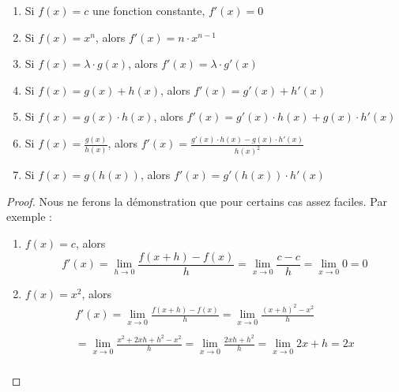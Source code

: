 \begin{proposition}
\begin{enumerate}
\item Si $f(x) = c$ une fonction constante, $f'(x) = 0$
\item Si $f(x) = x^n$, alors $f'(x) = n\cdot x^{n-1}$
\item Si $f(x) = \lambda \cdot g(x)$, alors $f'(x) = \lambda \cdot g'(x)$
\item Si $f(x) = g(x) + h(x)$, alors $f'(x) = g'(x) + h'(x)$
\item Si $f(x) = g(x) \cdot h(x)$, alors $f'(x) = g'(x) \cdot h(x) + g(x) \cdot h'(x)$
\item Si $f(x) = \frac{g(x)}{h(x)}$, alors $f'(x) = \frac{g'(x) \cdot h(x)- g(x) \cdot h'(x)}{h(x)^2}$
\item Si $f(x) = g\left(h(x)\right)$, alors $f'(x) = g'(h(x)) \cdot h'(x)$
\end{enumerate}
\end{proposition}

\begin{proof}
Nous ne ferons la démonstration que pour certains cas assez faciles. Par exemple :
\begin{enumerate}
\item $f(x) = c$, alors 
$$
f'(x) = \lim_{h\rightarrow 0} \frac{f(x+h) - f(x)}{h} = \lim_{x\rightarrow 0} \frac{c-c}{h} = \lim_{x\rightarrow 0} 0 = 0 
$$
\item $f(x) = x^2$, alors
$$
\begin{array}{l}
f'(x) = \lim_{x\rightarrow 0} \frac{f(x+h)-f(x)}{h} = \lim_{x\rightarrow 0} \frac{(x+h)^2 - x^2}{h} \\
\\ 
= \lim_{x\rightarrow 0} \frac{x^2 + 2xh + h^2 - x^2}{h} 
= \lim_{x\rightarrow 0} \frac{2xh+h^2}{h} = \lim_{x\rightarrow 0}2x + h = 2x\\
\end{array}
$$
\end{enumerate}
\end{proof}

